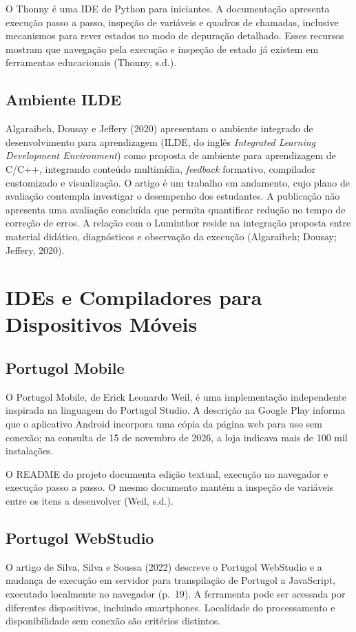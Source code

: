 \documentclass[
    12pt
    ,oneside
    ,a4paper
    ,chapter=TITLE
    ,section=TITLE
    ,sumario=abnt-6027-2012]{abntex2}
\newcommand{\citeAlgaraibeh}{(Algaraibeh; Dousay; Jeffery, 2020)}
\newcommand{\textAlgaraibeh}{Algaraibeh, Dousay e Jeffery (2020)\xspace}
\begin{document}
O Thonny é uma IDE de Python para iniciantes. A documentação apresenta execução
passo a passo, inspeção de variáveis e quadros de chamadas, inclusive mecanismos
para rever estados no modo de depuração detalhado. Esses recursos mostram que
navegação pela execução e inspeção de estado já existem em ferramentas educacionais
(Thonny, s.d.).

\subsection{Ambiente ILDE}

\textAlgaraibeh apresentam o ambiente integrado de desenvolvimento para aprendizagem (ILDE, do inglês \textit{Integrated Learning Development Environment}) como proposta de ambiente para aprendizagem
de C/C++, integrando conteúdo multimídia, \textit{feedback} formativo,
compilador customizado e visualização. O artigo é um trabalho em andamento,
cujo plano de avaliação contempla investigar o desempenho dos estudantes.
A publicação não apresenta uma avaliação concluída que permita quantificar
redução no tempo de correção de erros.
A relação com o Luminthor reside na integração proposta entre material didático,
diagnósticos e observação da execução \citeAlgaraibeh.
\section{IDEs e Compiladores para Dispositivos Móveis}

\subsection{Portugol Mobile}
O Portugol Mobile, de Erick Leonardo Weil, é uma implementação independente
inspirada na linguagem do Portugol Studio. A descrição na Google Play informa
que o aplicativo Android incorpora uma cópia da página web para uso sem conexão;
na consulta de 15 de novembro de 2026, a loja indicava mais de 100 mil instalações.


O README do projeto documenta edição textual, execução no navegador e execução
passo a passo. O mesmo documento mantém a inspeção de variáveis entre os itens a desenvolver (Weil, s.d.).

\subsection{Portugol WebStudio}
O artigo de Silva, Silva e Soussa (2022) descreve o Portugol WebStudio e a
mudança de execução em servidor para transpilação de Portugol a JavaScript,
executado localmente no navegador (p.~19). A ferramenta pode ser acessada por
diferentes dispositivos, incluindo smartphones. Localidade do processamento e
disponibilidade sem conexão são critérios distintos.
\end{document}
